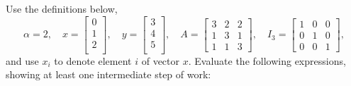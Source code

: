 \documentclass{article}
\def\blu#1{{\color{blu}#1}}
\begin{document}
Use the definitions below,
\[
\alpha = 2,\quad
x = \left[\begin{array}{c}
0\\
1\\
2\\
\end{array}\right], \quad
y = \left[\begin{array}{c}
3\\
4\\
5\\
\end{array}\right],\quad
A = \left[\begin{array}{ccc}
3 & 2 & 2\\
1 & 3 & 1\\
1 & 1 & 3
\end{array}\right],\quad
I_3 = \left[\begin{array}{ccc}
1 & 0 & 0\\
0 & 1 & 0\\
0 & 0 & 1
\end{array}\right],
\]
and use $x_i$ to denote element $i$ of vector $x$.
\blu{Evaluate the following expressions, showing at least one intermediate step of work}:
\end{document}
